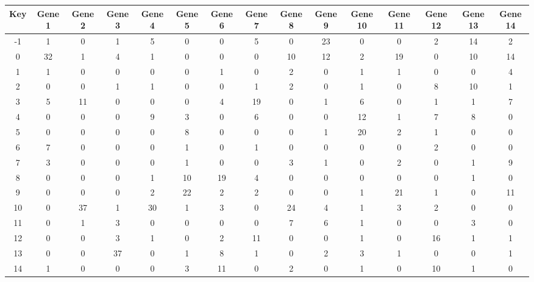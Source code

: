 \begin{tabular}{|c|c|c|c|c|c|c|c|c|c|c|c|c|c|c|}
\hline
Key & Gene 1 & Gene 2 & Gene 3 & Gene 4 & Gene 5 & Gene 6 & Gene 7 & Gene 8 & Gene 9 & Gene 10 & Gene 11 & Gene 12 & Gene 13 & Gene 14 \\
\hline
-1 & 1 & 0 & 1 & 5 & 0 & 0 & 5 & 0 & 23 & 0 & 0 & 2 & 14 & 2 \\
0 & 32 & 1 & 4 & 1 & 0 & 0 & 0 & 10 & 12 & 2 & 19 & 0 & 10 & 14 \\
1 & 1 & 0 & 0 & 0 & 0 & 1 & 0 & 2 & 0 & 1 & 1 & 0 & 0 & 4 \\
2 & 0 & 0 & 1 & 1 & 0 & 0 & 1 & 2 & 0 & 1 & 0 & 8 & 10 & 1 \\
3 & 5 & 11 & 0 & 0 & 0 & 4 & 19 & 0 & 1 & 6 & 0 & 1 & 1 & 7 \\
4 & 0 & 0 & 0 & 9 & 3 & 0 & 6 & 0 & 0 & 12 & 1 & 7 & 8 & 0 \\
5 & 0 & 0 & 0 & 0 & 8 & 0 & 0 & 0 & 1 & 20 & 2 & 1 & 0 & 0 \\
6 & 7 & 0 & 0 & 0 & 1 & 0 & 1 & 0 & 0 & 0 & 0 & 2 & 0 & 0 \\
7 & 3 & 0 & 0 & 0 & 1 & 0 & 0 & 3 & 1 & 0 & 2 & 0 & 1 & 9 \\
8 & 0 & 0 & 0 & 1 & 10 & 19 & 4 & 0 & 0 & 0 & 0 & 0 & 1 & 0 \\
9 & 0 & 0 & 0 & 2 & 22 & 2 & 2 & 0 & 0 & 1 & 21 & 1 & 0 & 11 \\
10 & 0 & 37 & 1 & 30 & 1 & 3 & 0 & 24 & 4 & 1 & 3 & 2 & 0 & 0 \\
11 & 0 & 1 & 3 & 0 & 0 & 0 & 0 & 7 & 6 & 1 & 0 & 0 & 3 & 0 \\
12 & 0 & 0 & 3 & 1 & 0 & 2 & 11 & 0 & 0 & 1 & 0 & 16 & 1 & 1 \\
13 & 0 & 0 & 37 & 0 & 1 & 8 & 1 & 0 & 2 & 3 & 1 & 0 & 0 & 1 \\
14 & 1 & 0 & 0 & 0 & 3 & 11 & 0 & 2 & 0 & 1 & 0 & 10 & 1 & 0 \\
\hline
\end{tabular}